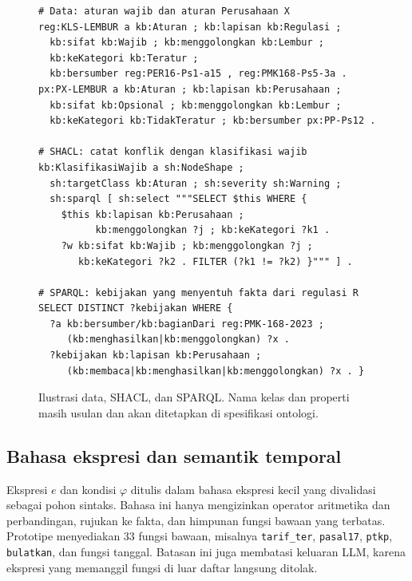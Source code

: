 \begin{figure}[t]
\begin{lstlisting}[language=rdf]
# Data: aturan wajib dan aturan Perusahaan X
reg:KLS-LEMBUR a kb:Aturan ; kb:lapisan kb:Regulasi ;
  kb:sifat kb:Wajib ; kb:menggolongkan kb:Lembur ;
  kb:keKategori kb:Teratur ;
  kb:bersumber reg:PER16-Ps1-a15 , reg:PMK168-Ps5-3a .
px:PX-LEMBUR a kb:Aturan ; kb:lapisan kb:Perusahaan ;
  kb:sifat kb:Opsional ; kb:menggolongkan kb:Lembur ;
  kb:keKategori kb:TidakTeratur ; kb:bersumber px:PP-Ps12 .

# SHACL: catat konflik dengan klasifikasi wajib
kb:KlasifikasiWajib a sh:NodeShape ;
  sh:targetClass kb:Aturan ; sh:severity sh:Warning ;
  sh:sparql [ sh:select """SELECT $this WHERE {
    $this kb:lapisan kb:Perusahaan ;
          kb:menggolongkan ?j ; kb:keKategori ?k1 .
    ?w kb:sifat kb:Wajib ; kb:menggolongkan ?j ;
       kb:keKategori ?k2 . FILTER (?k1 != ?k2) }""" ] .

# SPARQL: kebijakan yang menyentuh fakta dari regulasi R
SELECT DISTINCT ?kebijakan WHERE {
  ?a kb:bersumber/kb:bagianDari reg:PMK-168-2023 ;
     (kb:menghasilkan|kb:menggolongkan) ?x .
  ?kebijakan kb:lapisan kb:Perusahaan ;
     (kb:membaca|kb:menghasilkan|kb:menggolongkan) ?x . }
\end{lstlisting}
\caption{Ilustrasi data,  SHACL, dan  SPARQL. Nama kelas dan properti masih usulan dan akan ditetapkan di spesifikasi ontologi.}
\label{lst:rdf}
\end{figure}


\subsection{Bahasa ekspresi dan semantik temporal}
\label{subsec:ekspresi}

Ekspresi $e$ dan kondisi $\varphi$ ditulis dalam bahasa ekspresi kecil yang divalidasi sebagai pohon sintaks. Bahasa ini hanya mengizinkan operator aritmetika dan perbandingan, rujukan ke fakta, dan himpunan fungsi bawaan yang terbatas. Prototipe menyediakan 33 fungsi bawaan, misalnya \texttt{tarif\_ter}, \texttt{pasal17}, \texttt{ptkp}, \texttt{bulatkan}, dan fungsi tanggal. Batasan ini juga membatasi keluaran LLM, karena ekspresi yang memanggil fungsi di luar daftar langsung ditolak.

